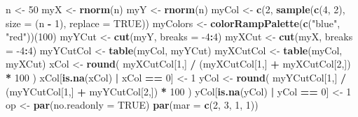 \documentclass[
]{book}
\newenvironment{Shaded}{\begin{snugshade}}{\end{snugshade}}
\newcommand{\DataTypeTok}[1]{\textcolor[rgb]{0.13,0.29,0.53}{#1}}
\newcommand{\DecValTok}[1]{\textcolor[rgb]{0.00,0.00,0.81}{#1}}
\newcommand{\KeywordTok}[1]{\textcolor[rgb]{0.13,0.29,0.53}{\textbf{#1}}}
\newcommand{\NormalTok}[1]{#1}
\newcommand{\OperatorTok}[1]{\textcolor[rgb]{0.81,0.36,0.00}{\textbf{#1}}}
\newcommand{\OtherTok}[1]{\textcolor[rgb]{0.56,0.35,0.01}{#1}}
\newcommand{\StringTok}[1]{\textcolor[rgb]{0.31,0.60,0.02}{#1}}
\begin{document}
\begin{Shaded}
\begin{Highlighting}[]
\NormalTok{n <-}\StringTok{ }\DecValTok{50}
\NormalTok{myX <-}\StringTok{ }\KeywordTok{rnorm}\NormalTok{(n)}
\NormalTok{myY <-}\StringTok{ }\KeywordTok{rnorm}\NormalTok{(n)}
\NormalTok{myCol <-}\StringTok{ }\KeywordTok{c}\NormalTok{(}\DecValTok{2}\NormalTok{, }\KeywordTok{sample}\NormalTok{(}\KeywordTok{c}\NormalTok{(}\DecValTok{4}\NormalTok{, }\DecValTok{2}\NormalTok{), }\DataTypeTok{size =}\NormalTok{ (n }\OperatorTok{-}\StringTok{ }\DecValTok{1}\NormalTok{), }\DataTypeTok{replace =} \OtherTok{TRUE}\NormalTok{))}
\NormalTok{myColors <-}\StringTok{ }\KeywordTok{colorRampPalette}\NormalTok{(}\KeywordTok{c}\NormalTok{(}\StringTok{"blue"}\NormalTok{, }\StringTok{"red"}\NormalTok{))(}\DecValTok{100}\NormalTok{)}
\NormalTok{myYCut <-}\StringTok{ }\KeywordTok{cut}\NormalTok{(myY, }\DataTypeTok{breaks =} \DecValTok{-4}\OperatorTok{:}\DecValTok{4}\NormalTok{)}
\NormalTok{myXCut <-}\StringTok{ }\KeywordTok{cut}\NormalTok{(myX, }\DataTypeTok{breaks =} \DecValTok{-4}\OperatorTok{:}\DecValTok{4}\NormalTok{)}
\NormalTok{myYCutCol <-}\StringTok{ }\KeywordTok{table}\NormalTok{(myCol, myYCut)}
\NormalTok{myXCutCol <-}\StringTok{ }\KeywordTok{table}\NormalTok{(myCol, myXCut)}
\NormalTok{xCol <-}\StringTok{ }\KeywordTok{round}\NormalTok{(}
\NormalTok{  myXCutCol[}\DecValTok{1}\NormalTok{,] }\OperatorTok{/}\StringTok{ }\NormalTok{(myXCutCol[}\DecValTok{1}\NormalTok{,] }\OperatorTok{+}\StringTok{ }\NormalTok{myXCutCol[}\DecValTok{2}\NormalTok{,]) }\OperatorTok{*}\StringTok{ }\DecValTok{100}
\NormalTok{)}
\NormalTok{xCol[}\KeywordTok{is.na}\NormalTok{(xCol) }\OperatorTok{|}\StringTok{ }\NormalTok{xCol }\OperatorTok{==}\StringTok{ }\DecValTok{0}\NormalTok{] <-}\StringTok{ }\DecValTok{1}
\NormalTok{yCol <-}\StringTok{ }\KeywordTok{round}\NormalTok{(}
\NormalTok{  myYCutCol[}\DecValTok{1}\NormalTok{,] }\OperatorTok{/}\StringTok{ }\NormalTok{(myYCutCol[}\DecValTok{1}\NormalTok{,] }\OperatorTok{+}\StringTok{ }\NormalTok{myYCutCol[}\DecValTok{2}\NormalTok{,]) }\OperatorTok{*}\StringTok{ }\DecValTok{100}
\NormalTok{)}
\NormalTok{yCol[}\KeywordTok{is.na}\NormalTok{(yCol) }\OperatorTok{|}\StringTok{ }\NormalTok{yCol }\OperatorTok{==}\StringTok{ }\DecValTok{0}\NormalTok{] <-}\StringTok{ }\DecValTok{1}
\NormalTok{op <-}\StringTok{ }\KeywordTok{par}\NormalTok{(}\DataTypeTok{no.readonly =} \OtherTok{TRUE}\NormalTok{)}
\KeywordTok{par}\NormalTok{(}\DataTypeTok{mar =} \KeywordTok{c}\NormalTok{(}\DecValTok{2}\NormalTok{, }\DecValTok{3}\NormalTok{, }\DecValTok{1}\NormalTok{, }\DecValTok{1}\NormalTok{))}

\end{Highlighting}
\end{Shaded}
\end{document}
